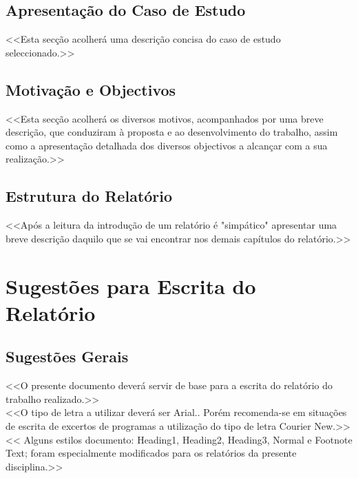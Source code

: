 \documentclass[a4paper,12pt]{scrreprt}
\begin{document}
    \section{Apresentação do Caso de Estudo}
        <<Esta secção acolherá uma descrição concisa do caso de estudo seleccionado.>>
    \section{Motivação e Objectivos}
        <<Esta secção acolherá os diversos motivos, acompanhados por uma breve descrição, que conduziram à proposta e ao desenvolvimento do trabalho, assim como a apresentação detalhada dos diversos objectivos a alcançar com a sua realização.>>
    \section{Estrutura do Relatório}
        <<Após a leitura da introdução de um relatório é "simpático" apresentar uma breve descrição daquilo que se vai encontrar nos demais capítulos do relatório.>>




\chapter{Sugestões para Escrita do Relatório}

    \section{Sugestões Gerais}
        <<O presente documento deverá servir de base para a escrita do relatório do trabalho realizado.>>\\

        <<O tipo de letra a utilizar deverá ser Arial.. Porém recomenda-se em situações de escrita de excertos de programas a utilização do tipo de letra Courier New.>>\\

        << Alguns estilos documento: Heading1, Heading2, Heading3, Normal e Footnote Text; foram especialmente modificados para os relatórios da presente disciplina.>>\\
\end{document}
